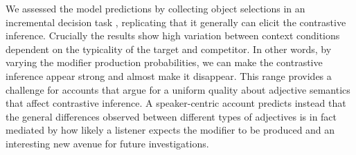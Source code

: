 \documentclass[10pt,letterpaper]{article}
\newcommand{\ek}[1]{\textcolor{Orange}{[ek: #1]}}
\begin{document}
We assessed the model predictions by collecting object selections in an incremental decision task \cite{Qing:2018}, replicating that it generally can elicit the contrastive inference. Crucially the results show high variation between context conditions dependent on the typicality of the target and competitor. In other words, by varying the modifier production probabilities, we can make the contrastive inference appear strong and almost make it disappear. This range provides a challenge for accounts that argue for a uniform quality about adjective semantics that affect contrastive inference. A speaker-centric account predicts instead that the general differences observed between different types of adjectives is in fact mediated by how likely a listener expects the modifier to be produced and an interesting new avenue for future investigations.


















\end{document}

